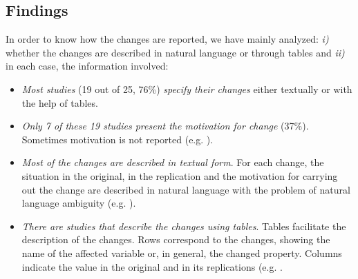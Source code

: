    


 
\subsection{Findings} 
\label{sec:SLR-Findings}
    
In order to know how the changes are reported, we have mainly analyzed: \emph{i)} whether the changes are described in natural language or through tables and \emph{ii)} in each case, the information involved:

\begin{itemize}
    
    \item \emph{Most studies} (19 out of 25, 76\%) \emph{specify their changes} either textually or with the help of tables.
    
    \item \emph{Only 7 of these 19 studies present the motivation for change} (37\%). Sometimes motivation is not reported (e.g. \cite{gomez2014replicated,kosar2018program}).
    
    \item \emph{Most of the changes are described in textual form}.  For each change, the situation in the original, in the replication and the motivation for carrying out the change are described in natural language with the problem of natural language ambiguity (e.g. \cite{albayrak2014investigation}). 
    
   
   
    \item \emph{There are studies that describe the changes using tables}. Tables facilitate the description of the changes. Rows correspond to the changes, showing the name of the affected variable or, in general, the changed property. Columns indicate the value in the original and in its replications (e.g. \cite{riaz2017identifying}.
    
    
 \end{itemize}   
 
